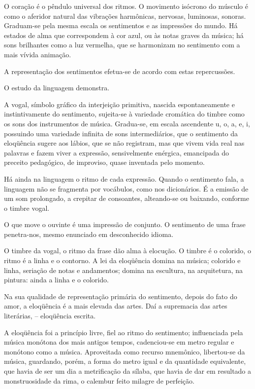 O coração é o pêndulo universal dos ritmos. O
movimento isócrono do músculo é como o aferidor natural das vibrações
harmônicas, nervosas, luminosas, sonoras. Graduam{}-se pela mesma
escala os sentimentos e as impressões do mundo. Há estados de alma que
correspondem à cor azul, ou às notas graves da música; há sons
brilhantes como a luz vermelha, que se harmonizam no sentimento com a
mais vívida animação. 

A representação dos sentimentos efetua{}-se de
acordo com estas repercussões. 

O estudo da linguagem demonstra. 

A vogal, símbolo gráfico da interjeição primitiva, nascida
espontaneamente e instintivamente do sentimento, sujeita{}-se à
variedade cromática do timbre como os sons dos instrumentos de música.
Gradua{}-se, em escala ascendente u, o, a, e, i, possuindo uma
variedade infinita de sons intermediários, que o sentimento da
eloqüência sugere aos lábios, que se não registram, mas que vivem vida
real nas palavras e fazem viver a expressão, sensivelmente enérgica,
emancipada do preceito pedagógico, de improviso, quase inventada pelo
momento. 

Há ainda na linguagem o ritmo de cada expressão. Quando o
sentimento fala, a linguagem não se fragmenta por vocábulos, como nos
dicionários. É a emissão de um som prolongado, a crepitar de
consoantes, alteando{}-se ou baixando, conforme o timbre vogal. 

O que move o ouvinte é uma impressão de conjunto. O sentimento de uma frase
penetra{}-nos, mesmo enunciado em desconhecido idioma. 

O timbre da vogal, o ritmo da frase dão alma à elocução. O timbre é o colorido, o
ritmo é a linha e o contorno. A lei da eloqüência domina na música;
colorido e linha, seriação de notas e andamentos; domina na escultura,
na arquitetura, na pintura: ainda a linha e o colorido. 

Na sua qualidade de representação primária do sentimento, depois do fato do
amor, a eloqüência é a mais elevada das artes. Daí a supremacia das
artes literárias, -- eloqüência escrita. 

A eloqüência foi a princípio
livre, fiel ao ritmo do sentimento; influenciada pela música monótona
dos mais antigos tempos, cadenciou{}-se em metro regular e monótono
como a música. Aproveitada como recurso mnemônico, libertou{}-se da
música, guardando, porém, a forma do metro igual e da quantidade
equivalente, que havia de ser um dia a metrificação da sílaba, que
havia de dar em resultado a monstruosidade da rima, o calembur feito
milagre de perfeição. 

